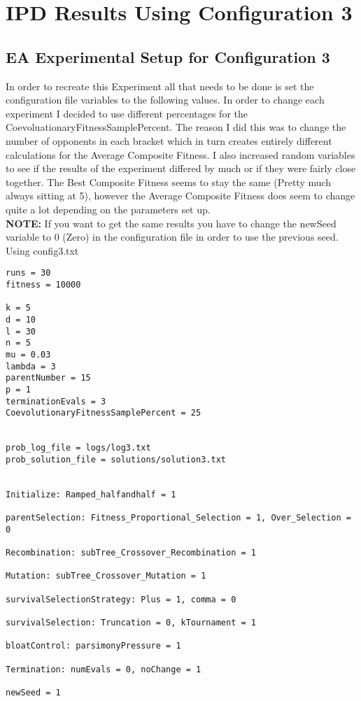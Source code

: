 \documentclass[•]{article}
\begin{document}
\pagebreak
\section{IPD Results Using Configuration 3}

\subsection{EA Experimental Setup for Configuration 3}
\indent \indent In order to recreate this Experiment all that needs to be done is set the configuration file variables to the following values.  In order to change each experiment I decided to use different percentages for the CoevoluationaryFitnessSamplePercent.  The reason I did this was to change the number of opponents in each bracket which in turn creates entirely different calculations for the Average Composite Fitness.  I also increased random variables to see if the results of the experiment differed by much or if they were fairly close together.  The Best Composite Fitness seems to stay the same (Pretty much always sitting at 5), however the Average Composite Fitness does seem to change quite a lot depending on the parameters set up.\\
\indent \textbf{NOTE:} If you want to get the same results you have to change the newSeed variable to 0 (Zero) in the configuration file in order to use the previous seed.\\

Using config3.txt 
\begin{lstlisting}
runs = 30
fitness = 10000

k = 5
d = 10
l = 30
n = 5
mu = 0.03
lambda = 3
parentNumber = 15
p = 1
terminationEvals = 3
CoevolutionaryFitnessSamplePercent = 25


prob_log_file = logs/log3.txt
prob_solution_file = solutions/solution3.txt


Initialize: Ramped_halfandhalf = 1

parentSelection: Fitness_Proportional_Selection = 1, Over_Selection = 0

Recombination: subTree_Crossover_Recombination = 1

Mutation: subTree_Crossover_Mutation = 1

survivalSelectionStrategy: Plus = 1, comma = 0

survivalSelection: Truncation = 0, kTournament = 1

bloatControl: parsimonyPressure = 1

Termination: numEvals = 0, noChange = 1

newSeed = 1
\end{lstlisting}
\end{document}
